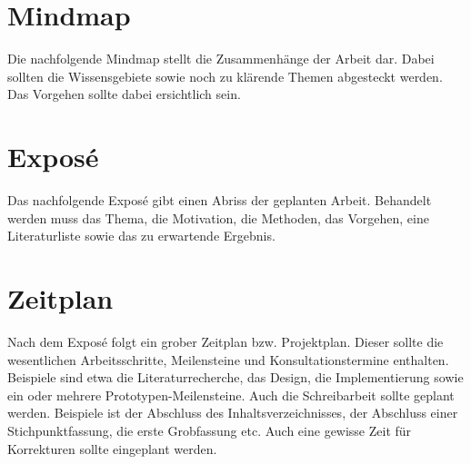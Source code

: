 \section{Mindmap}
Die nachfolgende Mindmap stellt die Zusammenhänge der Arbeit dar. Dabei sollten die Wissensgebiete sowie noch zu klärende Themen abgesteckt werden. Das Vorgehen sollte dabei ersichtlich sein.

\section{Exposé}
Das nachfolgende Exposé gibt einen Abriss der geplanten Arbeit. Behandelt werden muss das Thema, die Motivation, die Methoden, das Vorgehen, eine  Literaturliste sowie das  zu erwartende Ergebnis. 

\section{Zeitplan}
Nach dem Exposé folgt ein grober Zeitplan bzw. Projektplan. Dieser sollte die wesentlichen Arbeitsschritte, Meilensteine und Konsultationstermine enthalten. Beispiele sind etwa die Literaturrecherche, das Design, die Implementierung sowie ein oder mehrere Prototypen-Meilensteine. Auch die Schreibarbeit sollte geplant werden. Beispiele ist der Abschluss des Inhaltsverzeichnisses, der Abschluss einer Stichpunktfassung, die erste Grobfassung etc. Auch eine gewisse Zeit für Korrekturen sollte eingeplant werden.

